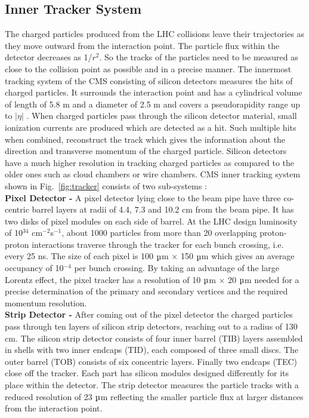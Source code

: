 \subsection{Inner Tracker System}
The charged particles produced from the LHC collisions leave their trajectories as they move outward from the interaction point. The particle flux within the detector decreases as 1/$r^2$. So the tracks of the particles need to be measured as close to the collision point as possible and in a precise manner. The innermost tracking system of the CMS consisting of silicon detectors measures the hits of charged particles. It surrounds the interaction point and has a cylindrical volume of length of 5.8 m and a diameter of 2.5 m and covers a pseudorapidity range up to $|\eta|$ . When charged particles pass through the silicon detector material, small ionization currents are produced which are detected as a hit. Such multiple hits when combined, reconstruct the track which gives the information about the direction and transverse momentum \pt of the charged particle. Silicon detectors have a much higher resolution in tracking charged particles as compared to the older ones such as cloud chambers or wire chambers. CMS inner tracking system shown in Fig.~\ref{fig:tracker} consists of two sub-systems :\\ \newline 
{\bf Pixel Detector -} A pixel detector lying close to the beam pipe have three co-centric barrel layers at radii of 4.4, 7.3 and 10.2 cm from the beam pipe. It has two disks of pixel modules on each side of barrel. At the LHC design luminosity of 10$^{34}$ cm$^{-2}$s$^{-1}$, about 1000 particles from more than 20 overlapping proton-proton interactions traverse through the tracker for each bunch crossing, i.e. every 25 ns. The size of each pixel is 100 $\micro$m $\times$ 150 $\micro$m which gives an average occupancy of 10$^{-4}$ per bunch crossing. By taking an advantage of the large Lorentz effect, the pixel tracker has a resolution of 10 $\micro$m $\times$ 20 $\micro$m needed for a precise determination of the primary and secondary vertices and the required momentum resolution. \\ \newline
{\bf Strip Detector -} After coming out of the pixel detector the charged particles pass through ten layers of silicon strip detectors, reaching out to a radius of 130 cm. The silicon strip detector consists of four inner barrel (TIB) layers assembled in shells with two inner endcaps (TID), each composed of three small discs. The outer barrel (TOB) consists of six concentric layers. Finally two endcaps (TEC) close off the tracker. Each part has silicon modules designed differently for its place within the detector. The strip detector measures the particle tracks with a reduced resolution of 23 $\micro$m reflecting the smaller particle flux at larger distances from the interaction point.
